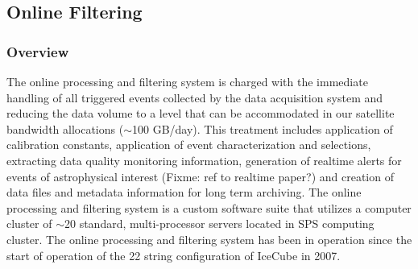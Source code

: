 

\subsection{Online Filtering}

\subsubsection{Overview}
The online processing and filtering system is charged with the immediate handling of all triggered events collected by the data
acquisition system and reducing the data volume to a level that can be
accommodated in our satellite bandwidth allocations ($\sim$100 GB/day).
This treatment includes application of calibration constants, application of event characterization and selections,  
extracting data quality monitoring information, generation of realtime alerts for events of astrophysical interest (Fixme: ref to realtime paper?)
and creation of data files and metadata information for long term archiving.  The online processing and filtering system
is a custom software suite that utilizes a computer cluster of $\sim$20 standard, multi-processor servers located in SPS computing cluster.
The online processing and filtering system has been in operation since the
start of operation of the 22 string configuration of IceCube in 2007.

